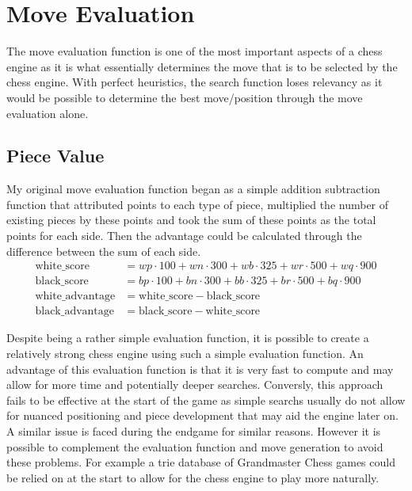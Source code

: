 \chapter{Move Evaluation}
The move evaluation function is one of the most important aspects of a chess engine as it is what essentially determines the move that is to be selected by the chess engine. With perfect heuristics, the search function loses relevancy as it would be possible to determine the best move/position through the move evaluation alone.
\section{Piece Value}
My original move evaluation function began as a simple addition subtraction function that attributed points to each type of piece, multiplied the number of existing pieces by these points and took the sum of these points as the total points for each side. Then the advantage could be calculated through the difference between the sum of each side. \begin{align*}
    \text{white\_score} &= wp \cdot 100 + wn \cdot 300 + wb \cdot 325 + wr \cdot 500 + wq \cdot 900\\
    \text{black\_score} &= bp \cdot 100 + bn \cdot 300 + bb \cdot 325 + br \cdot 500 + bq \cdot 900\\
    \text{white\_advantage} &= \text{white\_score} - \text{black\_score}\\
    \text{black\_advantage} &= \text{black\_score} -  \text{white\_score}
\end{align*}

Despite being a rather simple evaluation function, it is possible to create a relatively strong chess engine using such a simple evaluation function. An advantage of this evaluation function is that it is very fast to compute and may allow for more time and potentially deeper searches. Conversly, this approach fails to be effective at the start of the game as simple searchs usually do not allow for nuanced positioning and piece development that may aid the engine later on. A similar issue is faced during the endgame for similar reasons. However it is possible to complement the evaluation function and move generation to avoid these problems. For example a trie database of Grandmaster Chess games could be relied on at the start to allow for the chess engine to play more naturally.
